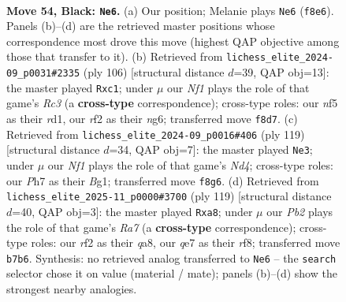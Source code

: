 \documentclass[11pt]{article}
\begin{document}
\clearpage

\begin{figure}[p]\centering
\begin{subfigure}{0.46\textwidth}\centering
\resizebox{\linewidth}{!}{%
\newchessgame
\chessboard[
  setfen={5nk1/1p2Q2p/8/5N1p/8/8/5R2/6K1 b - - 0 54},
  showmover=false,
  pgfstyle=straightmove, color=movearrow, markmove={f8-e6}
]}
\caption{}
\end{subfigure}\hfill
\begin{subfigure}{0.46\textwidth}\centering
\resizebox{\linewidth}{!}{%
\newchessgame
\chessboard[
  setfen={8/8/6nk/8/6P1/1pR1P3/4K3/2qr4 w - - 0 54},
  showmover=false,
  pgfstyle=straightmove, color=movearrow, markmove={c3-c1}
]}
\caption{}
\end{subfigure}
\\[4pt]
\begin{subfigure}{0.46\textwidth}\centering
\resizebox{\linewidth}{!}{%
\newchessgame
\chessboard[
  setfen={Q7/8/4p3/2Nn4/7p/6k1/2R5/1K4b1 b - - 0 60},
  showmover=false,
  pgfstyle=straightmove, color=movearrow, markmove={d5-e3}
]}
\caption{}
\end{subfigure}\hfill
\begin{subfigure}{0.46\textwidth}\centering
\resizebox{\linewidth}{!}{%
\newchessgame
\chessboard[
  setfen={Q4R2/4p3/3p2N1/6p1/4k3/4n3/r7/7K b - - 0 60},
  showmover=false,
  pgfstyle=straightmove, color=movearrow, markmove={a2-a8}
]}
\caption{}
\end{subfigure}
\caption{\textbf{Move 54, Black: \texttt{Ne6}.} (a) Our position; Melanie plays \texttt{Ne6} (\texttt{f8e6}). Panels (b)--(d) are the retrieved master positions whose correspondence most drove this move (highest QAP objective among those that transfer to it). (b) Retrieved from \texttt{lichess\_elite\_2024-09\_p0031\#2335} (ply 106) [structural distance $d$=39, QAP obj=13]: the master played \texttt{Rxc1}; under $\mu$ our \emph{Nf1} plays the role of that game's \emph{Rc3} (a \textbf{cross-type} correspondence); cross-type roles: our \emph{n}f5 as their \emph{r}d1, our \emph{r}f2 as their \emph{n}g6; transferred move \texttt{f8d7}. (c) Retrieved from \texttt{lichess\_elite\_2024-09\_p0016\#406} (ply 119) [structural distance $d$=34, QAP obj=7]: the master played \texttt{Ne3}; under $\mu$ our \emph{Nf1} plays the role of that game's \emph{Nd4}; cross-type roles: our \emph{P}h7 as their \emph{B}g1; transferred move \texttt{f8g6}. (d) Retrieved from \texttt{lichess\_elite\_2025-11\_p0000\#3700} (ply 119) [structural distance $d$=40, QAP obj=3]: the master played \texttt{Rxa8}; under $\mu$ our \emph{Pb2} plays the role of that game's \emph{Ra7} (a \textbf{cross-type} correspondence); cross-type roles: our \emph{r}f2 as their \emph{q}a8, our \emph{q}e7 as their \emph{r}f8; transferred move \texttt{b7b6}. Synthesis: no retrieved analog transferred to \texttt{Ne6} -- the \texttt{search} selector chose it on value (material / mate); panels (b)--(d) show the strongest nearby analogies.}
\label{fig:thought-m107}
\end{figure}
\end{document}
